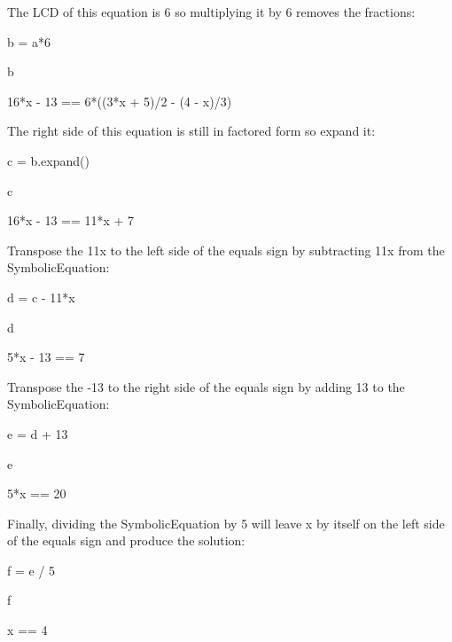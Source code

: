 \documentclass[12pt,oneside]{book}
\begin{document}
The LCD of this equation is 6 so multiplying it by 6 removes the fractions:

{\textquotedbl}{\textquotedbl}{\textquotedbl}

b = a*6

b

{\textbar}

16*x {}- 13 == 6*((3*x + 5)/2 {}- (4 {}- x)/3)


{\textquotedbl}{\textquotedbl}{\textquotedbl}

The right side of this equation is still in factored form so expand it:

{\textquotedbl}{\textquotedbl}{\textquotedbl}

c = b.expand()

c

{\textbar}

16*x {}- 13 == 11*x + 7


{\textquotedbl}{\textquotedbl}{\textquotedbl}

Transpose the 11x to the left side of the equals sign by subtracting 11x from the SymbolicEquation:

{\textquotedbl}{\textquotedbl}{\textquotedbl}

d = c {}- 11*x

d

{\textbar}

5*x {}- 13 == 7


{\textquotedbl}{\textquotedbl}{\textquotedbl}

Transpose the {}-13 to the right side of the equals sign by adding 13 to the SymbolicEquation:

{\textquotedbl}{\textquotedbl}{\textquotedbl}

e = d + 13

e

{\textbar}

5*x == 20


{\textquotedbl}{\textquotedbl}{\textquotedbl}

Finally, dividing the SymbolicEquation by 5 will leave x by itself on the left side of the equals sign and produce the solution:

{\textquotedbl}{\textquotedbl}{\textquotedbl}

f = e / 5

f

{\textbar}

x == 4


{\textquotedbl}{\textquotedbl}{\textquotedbl}
\end{document}
